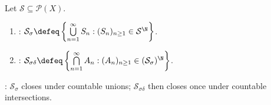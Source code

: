 \begin{definition} \label{def:sigma-and-sigma-delta-cover-classes} \\
Let $\mathcal{S}\subseteq\mathcal{P}(X)$.
\begin{enumerate}[label=(\roman*)]
\setlength{\itemsep}{0pt}
\item {}: $\mathcal{S}_\sigma\defeq\left\{\bigcup\limits_{n=1}^{\infty}S_n:(S_n)_{n\geq1}\in\mathcal{S}^{\N}\right\}$.
\item {}: $\mathcal{S}_{\sigma\delta}\defeq\left\{\bigcap\limits_{n=1}^{\infty}A_n:(A_n)_{n\geq1}\in(\mathcal{S}_\sigma)^{\N}\right\}$.
\end{enumerate}
: $\mathcal{S}_\sigma$ closes under countable unions; $\mathcal{S}_{\sigma\delta}$ then closes once under countable intersections.
\end{definition}

